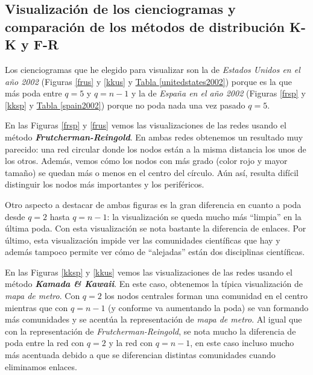 \documentclass[10pt,a4paper,spanish]{article}
\numberwithin{equation}{section} %
\numberwithin{figure}{section} %
\numberwithin{table}{section} %
\begin{document}
\subsection{Visualización de los cienciogramas y comparación de los métodos de distribución K-K y F-R}

Los cienciogramas que he elegido para visualizar son la de \textit{Estados Unidos en el año 2002} (Figuras \hyperref[frus]{\ref*{frus}} y \hyperref[kkus]{\ref*{kkus}} y \hyperref[unitedstates2002]{Tabla \ref*{unitedstates2002}}) porque es la que más poda entre $q = 5$ y $q = n-1$ y la de \textit{España en el año 2002} (Figuras \hyperref[frsp]{\ref*{frsp}} y \hyperref[kksp]{\ref*{kksp}} y \hyperref[spain2002]{Tabla \ref*{spain2002}}) porque no poda nada una vez pasado $q = 5$.

En las Figuras \hyperref[frsp]{\ref*{frsp}} y \hyperref[frus]{\ref*{frus}} vemos las visualizaciones de las redes usando el método \textit{\textbf{Frutcherman-Reingold}}. En ambas redes obtenemos un resultado muy parecido: una red circular donde los nodos están a la misma distancia los unos de los otros.  Además, vemos cómo los nodos con más grado (color rojo y mayor tamaño) se quedan más o menos en el centro del círculo. Aún así, resulta difícil distinguir los nodos más importantes y los periféricos. 

Otro aspecto a destacar de ambas figuras es la gran diferencia en cuanto a poda desde $q = 2$ hasta $q = n-1$: la visualización se queda mucho más ``limpia'' en la última poda. Con esta visualización se nota bastante la diferencia de enlaces. Por último, esta visualización impide ver las comunidades científicas que hay y además tampoco permite ver cómo de ``alejadas'' están dos disciplinas científicas.

En las Figuras \hyperref[kksp]{\ref*{kksp}} y \hyperref[kkus]{\ref*{kkus}} vemos las visualizaciones de las redes usando el método \textit{\textbf{Kamada \& Kawaii}}. En este caso, obtenemos la típica visualización de \textit{mapa de metro}. Con $q=2$ los nodos centrales forman una comunidad en el centro mientras que con $q=n-1$ (y conforme va aumentando la poda) se van formando más comunidades y se acentúa la representación de \textit{mapa de metro}. Al igual que con la representación de \textit{Frutcherman-Reingold}, se nota mucho la diferencia de poda entre la red con $q=2$ y la red con $q=n-1$, en este caso incluso mucho más acentuada debido a que se diferencian distintas comunidades cuando eliminamos enlaces.
\end{document}
